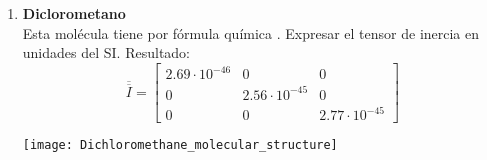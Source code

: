 \documentclass[11pt, spanish, a4paper, twoside]{article}
\begin{document}
\begin{enumerate}
	

	\item 
	\begin{minipage}[t][3cm]{0.73\textwidth}
	\textbf{Diclorometano}\\
	Esta molécula tiene por fórmula química . Expresar el tensor de inercia en unidades del SI.
		Resultado:\\
		\[
			\overline{\overline{I}} = \left[\begin{matrix}2.69 \cdot 10^{-46} & 0 & 0\\0 & 2.56 \cdot 10^{-45} & 0\\0 & 0 & 2.77 \cdot 10^{-45}\end{matrix}\right]
		\]
	\end{minipage}
	\begin{minipage}[c][0.5cm][t]{0.2\textwidth}
		\texttt{[image: Dichloromethane\_molecular\_structure]}
	\end{minipage}




\end{enumerate}
\end{document}

